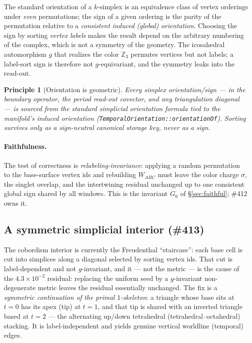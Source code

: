 \documentclass[11pt]{article}
\newtheorem{principle}{Principle}
\theoremstyle{definition}
\newcommand{\Z}{\mathbb{Z}}
\newcommand{\sigmacol}{\sigma}
\begin{document}
The standard orientation of a $k$-simplex is an equivalence class of vertex orderings
under \emph{even} permutations; the sign of a given ordering is the parity of the
permutation relative to a \emph{consistent induced (global) orientation}. Choosing the
sign by sorting \emph{vertex labels} makes the result depend on the arbitrary numbering
of the complex, which is not a symmetry of the geometry. The icosahedral automorphism
$g$ that realizes the color $\Z_3$ permutes vertices but not labels; a label-sort sign
is therefore not $g$-equivariant, and the symmetry leaks into the read-out.

\begin{principle}[Orientation is geometric]
\label{prin:orient}
Every simplex orientation/sign --- in the boundary operator, the period read-out
covector, and any triangulation diagonal --- is sourced from the standard simplicial
orientation formula tied to the manifold's induced orientation
(\texttt{TemporalOrientation::}\allowbreak\texttt{orientationOf}). Sorting survives only as a sign-neutral
canonical storage key, never as a sign.
\end{principle}

\paragraph{Faithfulness.} The test of correctness is \emph{relabeling-invariance}:
applying a random permutation to the base-surface vertex ids and rebuilding $W_{ABC}$
must leave the color charge $\sigmacol$, the singlet overlap, and the intertwining
residual unchanged up to one consistent global sign shared by all windows. This is the
invariant $G_6$ of \S\ref{sec:faithful}; \#412 owns it.

\subsection{A symmetric simplicial interior (\#413)}
\label{sec:interior}

The cobordism interior is currently the Freudenthal ``staircase'': each base cell is cut
into simplices along a diagonal selected by sorting vertex ids. That cut is
label-dependent and not $g$-invariant, and it --- not the metric --- is the cause of the
$4.3\times10^{-2}$ residual: replacing the uniform seed by a $g$-invariant
non-degenerate metric leaves the residual essentially unchanged. The fix is a
\emph{symmetric continuation of the primal $1$-skeleton}: a triangle whose base sits at
$t=0$ has its apex (tip) at $t=1$, and that tip is shared with an inverted triangle based
at $t=2$ --- the alternating up/down tetrahedral (tetrahedral--octahedral) stacking. It
is label-independent and yields genuine vertical worldline (temporal) edges.
\end{document}
